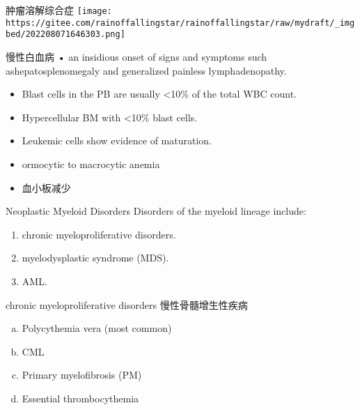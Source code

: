 \documentclass[
  ignorenonframetext,
]{beamer}
\begin{document}
\begin{frame}
\begin{block}{肿瘤溶解综合症}
\protect\hypertarget{ux80bfux7624ux6eb6ux89e3ux7efcux5408ux75c7}{}
\texttt{[image: https://gitee.com/rainoffallingstar/rainoffallingstar/raw/mydraft/\_imgbed/202208071646303.png]}
\end{block}
\end{frame}

\begin{frame}
\begin{block}{慢性白血病}
\protect\hypertarget{ux6162ux6027ux767dux8840ux75c5}{}
• an insidious onset of signs and symptoms such ashepatosplenomegaly and
generalized painless lymphadenopathy.

\begin{itemize}
\item
  Blast cells in the PB are usually \textless10\% of the total WBC
  count.
\item
  Hypercellular BM with \textless10\% blast cells.
\item
  Leukemic cells show evidence of maturation.
\item
  ormocytic to macrocytic anemia
\item
  血小板减少
\end{itemize}
\end{block}
\end{frame}

\begin{frame}
\begin{block}{Neoplastic Myeloid Disorders}
\protect\hypertarget{neoplastic-myeloid-disorders}{}
Disorders of the myeloid lineage include:

\begin{enumerate}
\item
  chronic myeloproliferative disorders.
\item
  myelodysplastic syndrome (MDS).
\item
  AML.
\end{enumerate}
\end{block}
\end{frame}

\begin{frame}
\begin{block}{chronic myeloproliferative disorders 慢性骨髓增生性疾病}
\protect\hypertarget{chronic-myeloproliferative-disorders-ux6162ux6027ux9aa8ux9ad3ux589eux751fux6027ux75beux75c5}{}
\begin{enumerate}
[a.]
\item
  Polycythemia vera (most common)
\item
  CML
\item
  Primary myelofibrosis (PM)
\item
  Essential thrombocythemia
\end{enumerate}
\end{block}
\end{frame}
\end{document}
